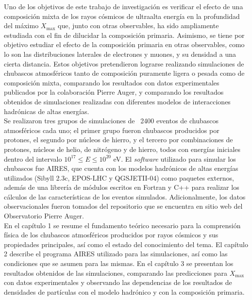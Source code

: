 Uno de los objetivos de este trabajo de investigación es verificar el efecto de una composición mixta de los rayos cósmicos de ultraalta energía en la profundidad del máximo $X_{\text{max}}$ que, junto con otras observables, ha sido ampliamente estudiada con el fin de dilucidar la composición primaria. Asimismo, se tiene por objetivo estudiar el efecto de la composición primaria en otras observables, como lo son las distribuciones laterales de electrones y muones, y su densidad a una cierta distancia. Estos objetivos pretendieron lograrse realizando simulaciones de chubascos atmosféricos tanto de composición puramente ligera o pesada como de composición mixta, comparando los resultados con datos experimentales publicados por la colaboración Pierre Auger, y comparando los resultados obtenidos de simulaciones realizadas con diferentes modelos de interacciones hadrónicas de altas energías.\\
 
Se realizaron tres grupos de simulaciones de ~2400 eventos de chubascos atmosféricos cada uno; el primer grupo fueron chubascos producidos por protones, el segundo por núcleos de hierro, y el tercero por combinaciones de protones, núcleos de helio, de nitrógeno y de hierro, todos con energías iniciales dentro del intervalo $10^{17} \leq E \leq 10^{20}$ eV. El \textit{software} utilizado para simular los chubascos fue AIRES, que cuenta con los modelos hadrónicos de altas energías utilizados (Sibyll 2.3c, EPOS-LHC y QGSJETII-04) como paquetes externos, además de una librería de módulos escritos en Fortran y C++ para realizar los cálculos de las características de los eventos simulados. Adicionalmente, los datos observacionales fueron tomados del repositorio que se encuentra en sitio web del Observatorio Pierre Auger.\\

En el capítulo 1 se resume el fundamento teórico necesario para la comprensión física de los chubascos atmosféricos producidos por rayos cósmicos y sus propiedades principales, así como el estado del conocimiento del tema. El capítulo 2 describe el programa AIRES utilizado para las simulaciones, así como las condiciones que se asumen para las mismas. En el capítulo 3 se presentan los resultados obtenidos de las simulaciones, comparando las predicciones para $X_{\text{max}}$ con datos experimentales y observando las dependencias de los resultados de densidades de partículas con el modelo hadrónico y con la composición primaria.




\singlespace